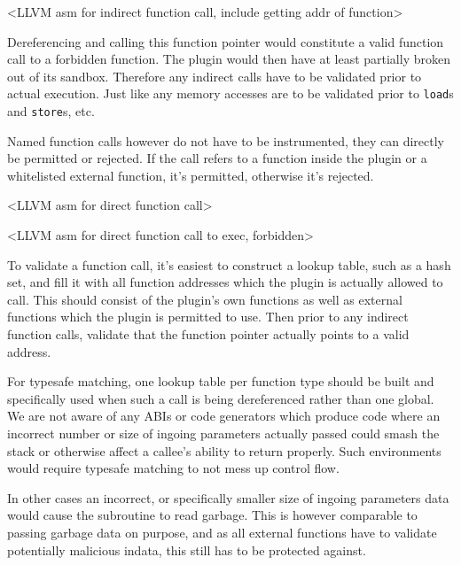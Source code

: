 <LLVM asm for indirect function call, include getting addr of function>

Dereferencing and calling this function pointer would constitute a valid
function call to a forbidden function. The plugin would then have at least
partially broken out of its sandbox.
Therefore any indirect calls have to be validated prior to actual execution.
Just like any memory accesses are to be validated prior to \texttt{load}s and
\texttt{store}s, etc.

Named function calls however do not have to be instrumented, they can directly
be permitted or rejected.
If the call refers to a function inside the plugin or a whitelisted external
function, it's permitted, otherwise it's rejected.

<LLVM asm for direct function call>

<LLVM asm for direct function call to exec, forbidden>

To validate a function call, it's easiest to construct a lookup table, such as a
hash set, and fill it with all function addresses which the plugin is actually
allowed to call.
This should consist of the plugin's own functions as well as external functions
which the plugin is permitted to use.
Then prior to any indirect function calls, validate that the function pointer
actually points to a valid address.

For typesafe matching, one lookup table per function type should be built and
specifically used when such a call is being dereferenced rather than one global.
We are not aware of any ABIs or code generators which produce code where an
incorrect number or size of ingoing parameters actually passed could smash the
stack or otherwise affect a callee's ability to return properly.
Such environments would require typesafe matching to not mess up control flow.

In other cases an incorrect, or specifically smaller size of ingoing parameters
data would cause the subroutine to read garbage.
This is however comparable to passing garbage data on purpose, and as all
external functions have to validate potentially malicious indata, this still has
to be protected against.
